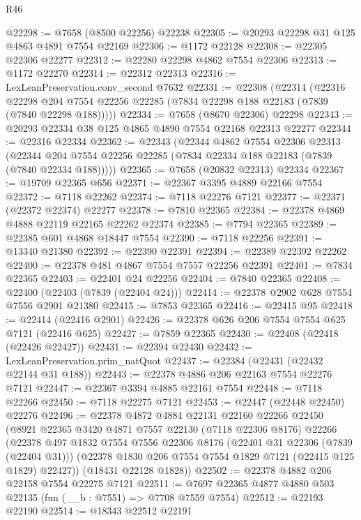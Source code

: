 \begin{lexlean}{R46}
\begin{coremodule}
@22298 := @7658 (@8500 @22256) @22238
@22305 := @20293 @22298 @31 @125 @4863 @4891 @7554 @22169
@22306 := @1172 @22128
@22308 := @22305 @22306 @22277
@22312 := @22280 @22298 @4862 @7554 @22306
@22313 := @1172 @22270
@22314 := @22312 @22313
@22316 := LexLeanPreservation.conv_second @7632
@22331 := @22308
    (@22314
      (@22316
        @22298
        @204
        @7554
        @22256
        @22285
        (@7834 @22298 @188 @22183 (@7839 (@7840 @22298 @188)))))
@22334 := @7658 (@8670 @22306) @22298
@22343 := @20293 @22334 @38 @125 @4865 @4890 @7554 @22168 @22313 @22277
@22344 := @22316 @22334
@22362 := @22343
    (@22344
      @4862
      @7554
      @22306
      @22313
      (@22344 @204 @7554 @22256 @22285 (@7834 @22334 @188 @22183 (@7839 (@7840 @22334 @188)))))
@22365 := @7658 (@20832 @22313) @22334
@22367 := @19709 @22365 @656
@22371 := @22367 @3395 @4889 @22166 @7554
@22372 := @7118 @22262
@22374 := @7118 @22276 @7121
@22377 := @22371 (@22372 @22374) @22277
@22378 := @7810 @22365
@22384 := @22378 @4869 @4888 @22119 @22165 @22262 @22374
@22385 := @7794 @22365
@22389 := @22385 @601 @4868 @18447 @7554
@22390 := @7118 @22256
@22391 := @13340 @21380
@22392 := @22390 @22391
@22394 := @22389 @22392 @22262
@22400 := @22378 @481 @4867 @7554 @7557 @22256 @22391
@22401 := @7834 @22365
@22403 := @22401 @24 @22256
@22404 := @7840 @22365
@22408 := @22400 (@22403 (@7839 (@22404 @24)))
@22414 := @22378 @2902 @628 @7554 @7556 @2901 @21380
@22415 := @7853 @22365
@22416 := @22415 @95
@22418 := @22414 (@22416 @2901)
@22426 := @22378 @626 @206 @7554 @7554 @625 @7121 (@22416 @625)
@22427 := @7859 @22365
@22430 := @22408 (@22418 (@22426 @22427))
@22431 := @22394 @22430
@22432 := LexLeanPreservation.prim_natQuot
@22437 := @22384 (@22431 (@22432 @22144 @31 @188))
@22443 := @22378 @4886 @206 @22163 @7554 @22276 @7121
@22447 := @22367 @3394 @4885 @22161 @7554
@22448 := @7118 @22266
@22450 := @7118 @22275 @7121
@22453 := @22447 (@22448 @22450) @22276
@22496 := @22378
    @4872
    @4884
    @22131
    @22160
    @22266
    @22450
    (@8921
      @22365
      @3420
      @4871
      @7557
      @22130
      (@7118 @22306 @8176)
      @22266
      (@22378
        @497
        @1832
        @7554
        @7556
        @22306
        @8176
        (@22401 @31 @22306 (@7839 (@22404 @31)))
        (@22378 @1830 @206 @7554 @7554 @1829 @7121 (@22415 @125 @1829) @22427))
      (@18431 @22128 @1828))
@22502 := @22378 @4882 @206 @22158 @7554 @22275 @7121
@22511 := @7697 @22365 @4877 @4880 @503 @22135 (fun (__b : @7551) => @7708 @7559 @7554)
@22512 := @22193 @22190
@22514 := @18343 @22512 @22191

\end{coremodule}
\end{lexlean}
